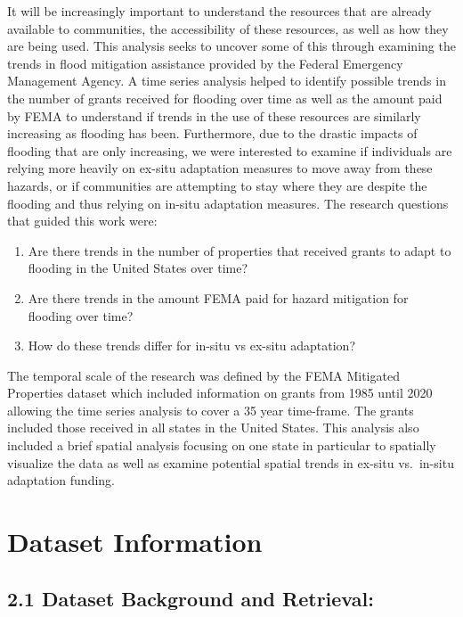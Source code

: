 \documentclass[
  12pt,
]{article}
\providecommand{\tightlist}{%
  \setlength{\itemsep}{0pt}\setlength{\parskip}{0pt}}
\begin{document}
It will be increasingly important to understand the resources that are
already available to communities, the accessibility of these resources,
as well as how they are being used. This analysis seeks to uncover some
of this through examining the trends in flood mitigation assistance
provided by the Federal Emergency Management Agency. A time series
analysis helped to identify possible trends in the number of grants
received for flooding over time as well as the amount paid by FEMA to
understand if trends in the use of these resources are similarly
increasing as flooding has been. Furthermore, due to the drastic impacts
of flooding that are only increasing, we were interested to examine if
individuals are relying more heavily on ex-situ adaptation measures to
move away from these hazards, or if communities are attempting to stay
where they are despite the flooding and thus relying on in-situ
adaptation measures. The research questions that guided this work were:

\begin{enumerate}
\def\labelenumi{\arabic{enumi}.}
\tightlist
\item
  Are there trends in the number of properties that received grants to
  adapt to flooding in the United States over time?
\item
  Are there trends in the amount FEMA paid for hazard mitigation for
  flooding over time?
\item
  How do these trends differ for in-situ vs ex-situ adaptation?
\end{enumerate}

The temporal scale of the research was defined by the FEMA Mitigated
Properties dataset which included information on grants from 1985 until
2020 allowing the time series analysis to cover a 35 year time-frame.
The grants included those received in all states in the United States.
This analysis also included a brief spatial analysis focusing on one
state in particular to spatially visualize the data as well as examine
potential spatial trends in ex-situ vs.~in-situ adaptation funding.

\newpage

\hypertarget{dataset-information}{%
\section{Dataset Information}\label{dataset-information}}

\hypertarget{dataset-background-and-retrieval}{%
\subsection{2.1 Dataset Background and
Retrieval:}\label{dataset-background-and-retrieval}}
\end{document}
